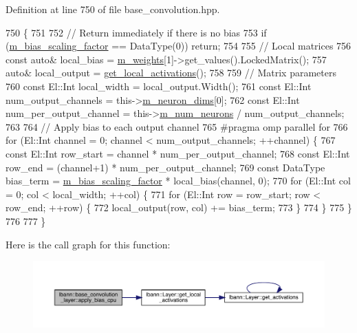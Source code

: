 Definition at line 750 of file base\+\_\+convolution.\+hpp.


\begin{DoxyCode}
750                         \{
751 
752     \textcolor{comment}{// Return immediately if there is no bias}
753     \textcolor{keywordflow}{if} (\hyperlink{classlbann_1_1base__convolution__layer_a5abe0bcd128b66a41fa481b28a9c2104}{m\_bias\_scaling\_factor} == DataType(0)) \textcolor{keywordflow}{return};
754 
755     \textcolor{comment}{// Local matrices}
756     \textcolor{keyword}{const} \textcolor{keyword}{auto}& local\_bias = \hyperlink{classlbann_1_1Layer_a7954e30fbf9100a6ba4b56d02767a469}{m\_weights}[1]->get\_values().LockedMatrix();
757     \textcolor{keyword}{auto}& local\_output = \hyperlink{classlbann_1_1Layer_a4248f27acebf72b7b7b3ee39c8bcb62a}{get\_local\_activations}();
758 
759     \textcolor{comment}{// Matrix parameters}
760     \textcolor{keyword}{const} El::Int local\_width = local\_output.Width();
761     \textcolor{keyword}{const} El::Int num\_output\_channels = this->\hyperlink{classlbann_1_1Layer_abb34bb8031f57a483e2e327a5f229f48}{m\_neuron\_dims}[0];
762     \textcolor{keyword}{const} El::Int num\_per\_output\_channel = this->\hyperlink{classlbann_1_1Layer_a6b5ebc8a7d9329d8a773ed787e7b41d8}{m\_num\_neurons} / num\_output\_channels;
763 
764     \textcolor{comment}{// Apply bias to each output channel}
765 \textcolor{preprocessor}{    #pragma omp parallel for}
766     \textcolor{keywordflow}{for} (El::Int channel = 0; channel < num\_output\_channels; ++channel) \{
767       \textcolor{keyword}{const} El::Int row\_start = channel * num\_per\_output\_channel;
768       \textcolor{keyword}{const} El::Int row\_end = (channel+1) * num\_per\_output\_channel;
769       \textcolor{keyword}{const} DataType bias\_term = \hyperlink{classlbann_1_1base__convolution__layer_a5abe0bcd128b66a41fa481b28a9c2104}{m\_bias\_scaling\_factor} * local\_bias(channel, 0);
770       \textcolor{keywordflow}{for} (El::Int col = 0; col < local\_width; ++col) \{
771         \textcolor{keywordflow}{for} (El::Int row = row\_start; row < row\_end; ++row) \{
772           local\_output(row, col) += bias\_term;
773         \}
774       \}
775     \}
776 
777   \}
\end{DoxyCode}
Here is the call graph for this function\+:\nopagebreak
\begin{figure}[H]
\begin{center}
\leavevmode
\includegraphics[width=350pt]{classlbann_1_1base__convolution__layer_a4f792e1c19d4591f305880b57f63cec3_cgraph}
\end{center}
\end{figure}
